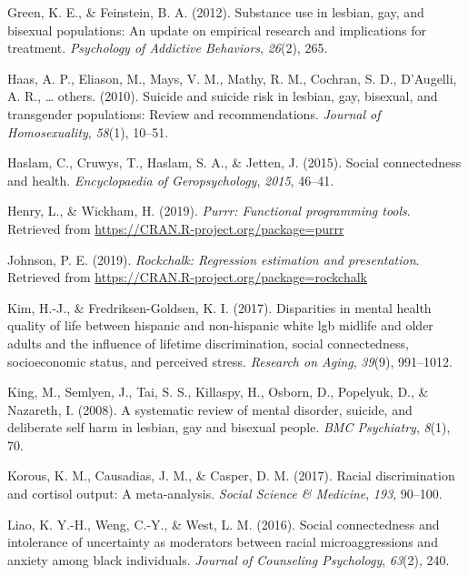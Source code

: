 \documentclass[
  english,
  man,floatsintext]{apa6}
\begin{document}
\leavevmode\hypertarget{ref-green2012}{}%
Green, K. E., \& Feinstein, B. A. (2012). Substance use in lesbian, gay, and bisexual populations: An update on empirical research and implications for treatment. \emph{Psychology of Addictive Behaviors}, \emph{26}(2), 265.

\leavevmode\hypertarget{ref-haas2010}{}%
Haas, A. P., Eliason, M., Mays, V. M., Mathy, R. M., Cochran, S. D., D'Augelli, A. R., \ldots{} others. (2010). Suicide and suicide risk in lesbian, gay, bisexual, and transgender populations: Review and recommendations. \emph{Journal of Homosexuality}, \emph{58}(1), 10--51.

\leavevmode\hypertarget{ref-haslam2015}{}%
Haslam, C., Cruwys, T., Haslam, S. A., \& Jetten, J. (2015). Social connectedness and health. \emph{Encyclopaedia of Geropsychology}, \emph{2015}, 46--41.

\leavevmode\hypertarget{ref-R-purrr}{}%
Henry, L., \& Wickham, H. (2019). \emph{Purrr: Functional programming tools}. Retrieved from \url{https://CRAN.R-project.org/package=purrr}

\leavevmode\hypertarget{ref-R-rockchalk}{}%
Johnson, P. E. (2019). \emph{Rockchalk: Regression estimation and presentation}. Retrieved from \url{https://CRAN.R-project.org/package=rockchalk}

\leavevmode\hypertarget{ref-kim2017}{}%
Kim, H.-J., \& Fredriksen-Goldsen, K. I. (2017). Disparities in mental health quality of life between hispanic and non-hispanic white lgb midlife and older adults and the influence of lifetime discrimination, social connectedness, socioeconomic status, and perceived stress. \emph{Research on Aging}, \emph{39}(9), 991--1012.

\leavevmode\hypertarget{ref-king2008}{}%
King, M., Semlyen, J., Tai, S. S., Killaspy, H., Osborn, D., Popelyuk, D., \& Nazareth, I. (2008). A systematic review of mental disorder, suicide, and deliberate self harm in lesbian, gay and bisexual people. \emph{BMC Psychiatry}, \emph{8}(1), 70.

\leavevmode\hypertarget{ref-korous2017}{}%
Korous, K. M., Causadias, J. M., \& Casper, D. M. (2017). Racial discrimination and cortisol output: A meta-analysis. \emph{Social Science \& Medicine}, \emph{193}, 90--100.

\leavevmode\hypertarget{ref-liao2016}{}%
Liao, K. Y.-H., Weng, C.-Y., \& West, L. M. (2016). Social connectedness and intolerance of uncertainty as moderators between racial microaggressions and anxiety among black individuals. \emph{Journal of Counseling Psychology}, \emph{63}(2), 240.
\end{document}
